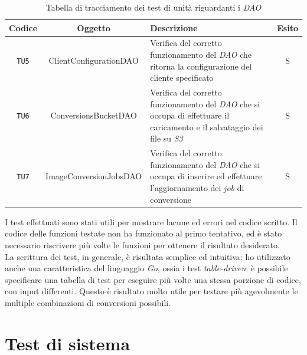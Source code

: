 \begin{table}[H]
    \caption{Tabella di tracciamento dei test di unità riguardanti i \emph{DAO}}
    \label{tab:test-dao}
    \begin{tabularx}{\textwidth}{|c|c|X|c|}
        \hline
        \textbf{Codice}                                          &
        \textbf{Oggetto}                                         & \textbf{Descrizione }  & \textbf{Esito} \\
        \hline
        \verb|TU5|                                               & ClientConfigurationDAO & Verifica del
        corretto funzionamento del \emph{DAO} che ritorna la configurazione del
        cliente specificato                                      & S                                       \\
        \hline
        \verb|TU6|                                               & ConversionsBucketDAO   & Verifica del
        corretto funzionamento del \emph{DAO} che si occupa di effettuare il
        caricamento e il salvataggio dei file su \emph{S3}       & S                                       \\
        \hline
        \verb|TU7|                                               & ImageConversionJobsDAO & Verifica del
        corretto funzionamento del \emph{DAO} che si occupa di inserire ed
        effettuare l'aggiornamento dei \emph{job} di conversione & S                                       \\
        \hline
    \end{tabularx}
\end{table}

I test effettuati sono stati utili per mostrare lacune ed errori nel codice
scritto. Il codice delle funzioni testate non ha funzionato al primo tentativo,
ed è stato necessario riscrivere più volte le funzioni per ottenere il risultato
desiderato. \\
La scrittura dei test, in generale, è risultata semplice ed intuitiva: ho
utilizzato anche una caratteristica del linguaggio \emph{Go}, ossia i test
\emph{table-driven}: è possibile specificare una tabella di test per eseguire
più volte una stessa porzione di codice, con input differenti. Questo è
risultato molto utile per testare più agevolmente le multiple combinazioni di
conversioni possibili.

\section{Test di sistema}

